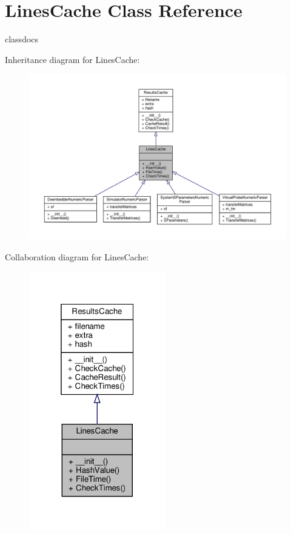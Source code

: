 \hypertarget{classSignalIntegrity_1_1ResultsCache_1_1LinesCache}{}\section{Lines\+Cache Class Reference}
\label{classSignalIntegrity_1_1ResultsCache_1_1LinesCache}


classdocs  




Inheritance diagram for Lines\+Cache\+:
\nopagebreak
\begin{figure}[H]
\begin{center}
\leavevmode
\includegraphics[width=350pt]{classSignalIntegrity_1_1ResultsCache_1_1LinesCache__inherit__graph}
\end{center}
\end{figure}


Collaboration diagram for Lines\+Cache\+:
\nopagebreak
\begin{figure}[H]
\begin{center}
\leavevmode
\includegraphics[width=169pt]{classSignalIntegrity_1_1ResultsCache_1_1LinesCache__coll__graph}
\end{center}
\end{figure}
